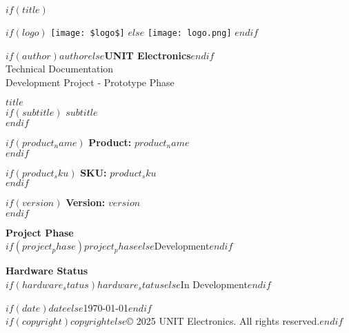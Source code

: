 \documentclass[11pt,a4paper]{article}
\begin{document}
$if(title)$
\begin{titlepage}
    \centering
    
    \vspace*{0.5cm}
    
    \begin{minipage}{0.3\textwidth}
        \centering
        $if(logo)$
        \texttt{[image: \$logo\$]}
        $else$
        \texttt{[image: logo.png]}
        $endif$
    \end{minipage}
    \hfill
    \begin{minipage}{0.6\textwidth}
        \raggedleft
        {\small \textbf{$if(author)$$author$$else$UNIT Electronics$endif$}}\\
        {\footnotesize Technical Documentation}\\
        {\footnotesize Development Project - Prototype Phase}
    \end{minipage}
    
    \vspace{2cm}
    
    {\huge \textbf{$title$}}\\[0.5cm]
    
    $if(subtitle)$
    {\Large $subtitle$}\\[1cm]
    $endif$
    
    $if(product_name)$
    {\large \textbf{Product:} $product_name$}\\[0.3cm]
    $endif$
    
    $if(product_sku)$
    {\large \textbf{SKU:} $product_sku$}\\[0.3cm]
    $endif$
    
    $if(version)$
    {\large \textbf{Version:} $version$}\\[1cm]
    $endif$
    
    \vfill
    
    \begin{minipage}{0.45\textwidth}
        \centering
        \textbf{Project Phase}\\
        $if(project_phase)$$project_phase$$else$Development$endif$
    \end{minipage}
    \hfill
    \begin{minipage}{0.45\textwidth}
        \centering
        \textbf{Hardware Status}\\
        $if(hardware_status)$$hardware_status$$else$In Development$endif$
    \end{minipage}
    
    \vspace{1cm}
    
    {\large $if(date)$$date$$else$\today$endif$}\\[0.5cm]
    {\footnotesize $if(copyright)$$copyright$$else$© 2025 UNIT Electronics. All rights reserved.$endif$}
    
\end{titlepage}
\end{document}
